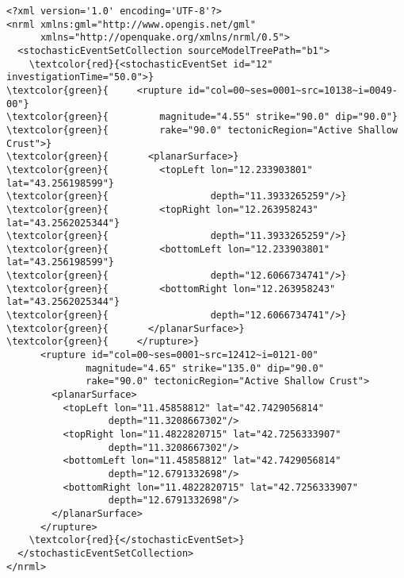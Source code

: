 \begin{Verbatim}[frame=single, commandchars=\\\{\}, fontsize=\small]
<?xml version='1.0' encoding='UTF-8'?>
<nrml xmlns:gml="http://www.opengis.net/gml"
	  xmlns="http://openquake.org/xmlns/nrml/0.5">
  <stochasticEventSetCollection sourceModelTreePath="b1">
    \textcolor{red}{<stochasticEventSet id="12" investigationTime="50.0">}
\textcolor{green}{     <rupture id="col=00~ses=0001~src=10138~i=0049-00"}
\textcolor{green}{         magnitude="4.55" strike="90.0" dip="90.0"}
\textcolor{green}{         rake="90.0" tectonicRegion="Active Shallow Crust">}
\textcolor{green}{       <planarSurface>}
\textcolor{green}{         <topLeft lon="12.233903801" lat="43.256198599"}
\textcolor{green}{                  depth="11.3933265259"/>}
\textcolor{green}{         <topRight lon="12.263958243" lat="43.2562025344"}
\textcolor{green}{                  depth="11.3933265259"/>}
\textcolor{green}{         <bottomLeft lon="12.233903801" lat="43.256198599"}
\textcolor{green}{                  depth="12.6066734741"/>}
\textcolor{green}{         <bottomRight lon="12.263958243" lat="43.2562025344"}
\textcolor{green}{                  depth="12.6066734741"/>}
\textcolor{green}{       </planarSurface>}
\textcolor{green}{     </rupture>}
      <rupture id="col=00~ses=0001~src=12412~i=0121-00"
              magnitude="4.65" strike="135.0" dip="90.0"
              rake="90.0" tectonicRegion="Active Shallow Crust">
        <planarSurface>
          <topLeft lon="11.45858812" lat="42.7429056814"
                  depth="11.3208667302"/>
          <topRight lon="11.4822820715" lat="42.7256333907"
                  depth="11.3208667302"/>
          <bottomLeft lon="11.45858812" lat="42.7429056814"
                  depth="12.6791332698"/>
          <bottomRight lon="11.4822820715" lat="42.7256333907"
                  depth="12.6791332698"/>
        </planarSurface>
      </rupture>
    \textcolor{red}{</stochasticEventSet>}
  </stochasticEventSetCollection>
</nrml>
\end{Verbatim}